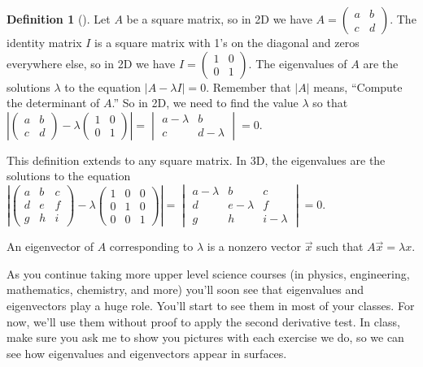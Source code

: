 \documentclass[10pt,]{book}
\theoremstyle{plain}
\theoremstyle{definition}
\newtheorem{definition}[theorem]{Definition}
\theoremstyle{definition}
\theoremstyle{definition}
\theoremstyle{definition}
\theoremstyle{definition}
\numberwithin{equation}{section}
\newcommand{\amp}{&}
\begin{document}
\begin{definition}[{}]\label{definition-39}
Let \(A\) be a square matrix, so in 2D we have \(A=\begin{pmatrix}a\amp b\\c\amp d
\end{pmatrix}\). The identity matrix \(I\) is a square matrix with 1's on the diagonal and zeros everywhere else, so in 2D we have \(I = \begin{pmatrix}1\amp 0\\0\amp 1
\end{pmatrix}\). The eigenvalues of \(A\) are the solutions \(\lambda\) to the equation \(|A-\lambda I|=0\). Remember that \(|A|\) means, ``Compute the determinant of \(A\).'' So in 2D, we need to find the value \(\lambda\) so that \(\left|\begin{pmatrix}a\amp b\\c\amp d
\end{pmatrix} -\lambda  \begin{pmatrix}1\amp 0\\0\amp 1
\end{pmatrix}  \right|=\begin{vmatrix} a-\lambda \amp b\\c\amp d-\lambda \end{vmatrix}=0.\)%
\par
This definition extends to any square matrix. In 3D, the eigenvalues are the solutions to the equation \(\left|\begin{pmatrix}a\amp b\amp c\\d\amp e\amp f\\g\amp h\amp i
\end{pmatrix} -\lambda 
\begin{pmatrix}1\amp 0\amp 0\\0\amp 1\amp 0\\0\amp 0\amp 1
\end{pmatrix}  \right| = 
\begin{vmatrix} a-\lambda\amp b\amp c\\d\amp e-\lambda\amp f\\g\amp h\amp i-\lambda\end{vmatrix}=0.\)%
\par
An eigenvector of \(A\) corresponding to \(\lambda\) is a nonzero vector \(\vec x\) such that \(A\vec x=\lambda x\).%
\end{definition}
As you continue taking more upper level science courses (in physics, engineering, mathematics, chemistry, and more) you'll soon see that eigenvalues and eigenvectors play a huge role. You'll start to see them in most of your classes. For now, we'll use them without proof to apply the second derivative test. In class, make sure you ask me to show you pictures with each exercise we do, so we can see how eigenvalues and eigenvectors appear in surfaces.%
\end{document}
